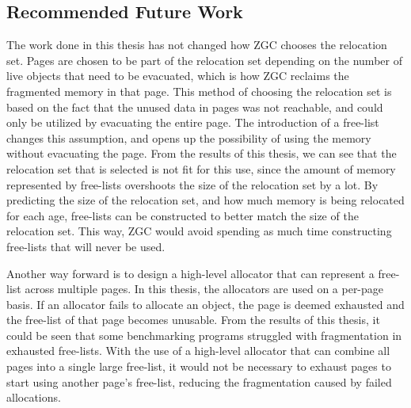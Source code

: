 \subsection{Recommended Future Work}
The work done in this thesis has not changed how ZGC chooses the relocation set. Pages are chosen to be part of the relocation set depending on the number of live objects that need to be evacuated, which is how ZGC reclaims the fragmented memory in that page. This method of choosing the relocation set is based on the fact that the unused data in pages was not reachable, and could only be utilized by evacuating the entire page. The introduction of a free-list changes this assumption, and opens up the possibility of using the memory without evacuating the page. From the results of this thesis, we can see that the relocation set that is selected is not fit for this use, since the amount of memory represented by free-lists overshoots the size of the relocation set by a lot. By predicting the size of the relocation set, and how much memory is being relocated for each age, free-lists can be constructed to better match the size of the relocation set. This way, ZGC would avoid spending as much time constructing free-lists that will never be used.

Another way forward is to design a high-level allocator that can represent a free-list across multiple pages. In this thesis, the allocators are used on a per-page basis. If an allocator fails to allocate an object, the page is deemed exhausted and the free-list of that page becomes unusable. From the results of this thesis, it could be seen that some benchmarking programs struggled with fragmentation in exhausted free-lists. With the use of a high-level allocator that can combine all pages into a single large free-list, it would not be necessary to exhaust pages to start using another page's free-list, reducing the fragmentation caused by failed allocations.

